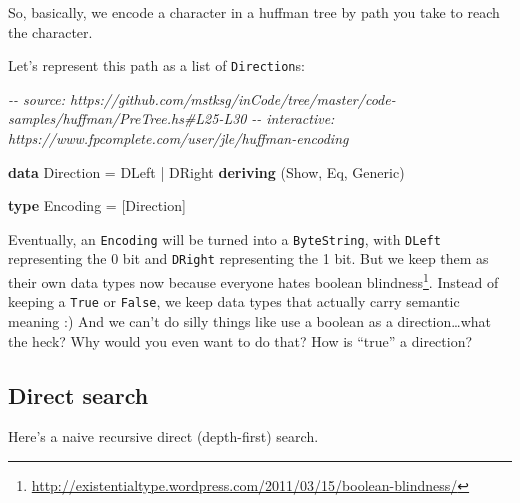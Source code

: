 \documentclass[]{article}
\newenvironment{Shaded}{}{}
\newcommand{\CommentTok}[1]{\textcolor[rgb]{0.38,0.63,0.69}{\textit{#1}}}
\newcommand{\DataTypeTok}[1]{\textcolor[rgb]{0.56,0.13,0.00}{#1}}
\newcommand{\KeywordTok}[1]{\textcolor[rgb]{0.00,0.44,0.13}{\textbf{#1}}}
\newcommand{\NormalTok}[1]{#1}
\newcommand{\OperatorTok}[1]{\textcolor[rgb]{0.40,0.40,0.40}{#1}}
\newcommand{\OtherTok}[1]{\textcolor[rgb]{0.00,0.44,0.13}{#1}}
\renewcommand{\href}[2]{#2\footnote{\url{#1}}}
\begin{document}
So, basically, we encode a character in a huffman tree by path you take to reach
the character.

Let's represent this path as a list of \texttt{Direction}s:

\begin{Shaded}
\begin{Highlighting}[]
\CommentTok{{-}{-} source: https://github.com/mstksg/inCode/tree/master/code{-}samples/huffman/PreTree.hs\#L25{-}L30}
\CommentTok{{-}{-} interactive: https://www.fpcomplete.com/user/jle/huffman{-}encoding}

\KeywordTok{data} \DataTypeTok{Direction} \OtherTok{=} \DataTypeTok{DLeft}
               \OperatorTok{|} \DataTypeTok{DRight}
               \KeywordTok{deriving}\NormalTok{ (}\DataTypeTok{Show}\NormalTok{, }\DataTypeTok{Eq}\NormalTok{, }\DataTypeTok{Generic}\NormalTok{)}

\KeywordTok{type} \DataTypeTok{Encoding} \OtherTok{=}\NormalTok{ [}\DataTypeTok{Direction}\NormalTok{]}
\end{Highlighting}
\end{Shaded}

Eventually, an \texttt{Encoding} will be turned into a \texttt{ByteString}, with
\texttt{DLeft} representing the 0 bit and \texttt{DRight} representing the 1
bit. But we keep them as their own data types now because everyone hates
\href{http://existentialtype.wordpress.com/2011/03/15/boolean-blindness/}{boolean
blindness}. Instead of keeping a \texttt{True} or \texttt{False}, we keep data
types that actually carry semantic meaning :) And we can't do silly things like
use a boolean as a direction\ldots what the heck? Why would you even want to do
that? How is ``true'' a direction?

\subsection{Direct search}\label{direct-search}

Here's a naive recursive direct (depth-first) search.
\end{document}
